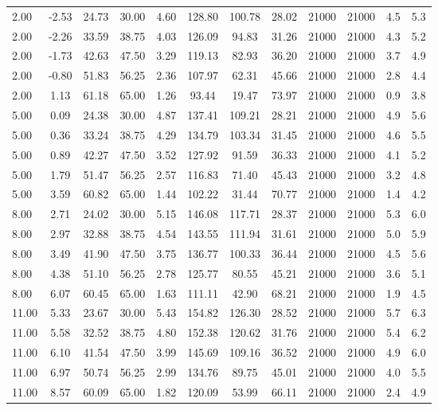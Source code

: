 \documentclass[english]{SPFShortReport}
\begin{document}
\begin{table}[!ht]
\begin{small}
\begin{center}
{\begin{tabular}{l | c c c c c c c c c c c }
2.00 & -2.53 & 24.73 & 30.00 & 4.60 & 128.80 & 100.78 & 28.02 & 21000 & 21000 & 4.5 & 5.3\\ 
2.00 & -2.26 & 33.59 & 38.75 & 4.03 & 126.09 & 94.83 & 31.26 & 21000 & 21000 & 4.3 & 5.2\\ 
2.00 & -1.73 & 42.63 & 47.50 & 3.29 & 119.13 & 82.93 & 36.20 & 21000 & 21000 & 3.7 & 4.9\\ 
2.00 & -0.80 & 51.83 & 56.25 & 2.36 & 107.97 & 62.31 & 45.66 & 21000 & 21000 & 2.8 & 4.4\\ 
2.00 & 1.13 & 61.18 & 65.00 & 1.26 & 93.44 & 19.47 & 73.97 & 21000 & 21000 & 0.9 & 3.8\\ 
5.00 & 0.09 & 24.38 & 30.00 & 4.87 & 137.41 & 109.21 & 28.21 & 21000 & 21000 & 4.9 & 5.6\\ 
5.00 & 0.36 & 33.24 & 38.75 & 4.29 & 134.79 & 103.34 & 31.45 & 21000 & 21000 & 4.6 & 5.5\\ 
5.00 & 0.89 & 42.27 & 47.50 & 3.52 & 127.92 & 91.59 & 36.33 & 21000 & 21000 & 4.1 & 5.2\\ 
5.00 & 1.79 & 51.47 & 56.25 & 2.57 & 116.83 & 71.40 & 45.43 & 21000 & 21000 & 3.2 & 4.8\\ 
5.00 & 3.59 & 60.82 & 65.00 & 1.44 & 102.22 & 31.44 & 70.77 & 21000 & 21000 & 1.4 & 4.2\\ 
8.00 & 2.71 & 24.02 & 30.00 & 5.15 & 146.08 & 117.71 & 28.37 & 21000 & 21000 & 5.3 & 6.0\\ 
8.00 & 2.97 & 32.88 & 38.75 & 4.54 & 143.55 & 111.94 & 31.61 & 21000 & 21000 & 5.0 & 5.9\\ 
8.00 & 3.49 & 41.90 & 47.50 & 3.75 & 136.77 & 100.33 & 36.44 & 21000 & 21000 & 4.5 & 5.6\\ 
8.00 & 4.38 & 51.10 & 56.25 & 2.78 & 125.77 & 80.55 & 45.21 & 21000 & 21000 & 3.6 & 5.1\\ 
8.00 & 6.07 & 60.45 & 65.00 & 1.63 & 111.11 & 42.90 & 68.21 & 21000 & 21000 & 1.9 & 4.5\\ 
11.00 & 5.33 & 23.67 & 30.00 & 5.43 & 154.82 & 126.30 & 28.52 & 21000 & 21000 & 5.7 & 6.3\\ 
11.00 & 5.58 & 32.52 & 38.75 & 4.80 & 152.38 & 120.62 & 31.76 & 21000 & 21000 & 5.4 & 6.2\\ 
11.00 & 6.10 & 41.54 & 47.50 & 3.99 & 145.69 & 109.16 & 36.52 & 21000 & 21000 & 4.9 & 6.0\\ 
11.00 & 6.97 & 50.74 & 56.25 & 2.99 & 134.76 & 89.75 & 45.01 & 21000 & 21000 & 4.0 & 5.5\\ 
11.00 & 8.57 & 60.09 & 65.00 & 1.82 & 120.09 & 53.99 & 66.11 & 21000 & 21000 & 2.4 & 4.9\\ 

\end{tabular}}
\end{center}
\end{small}
\end{table}
\end{document}
